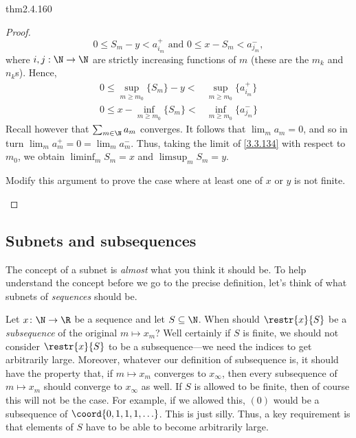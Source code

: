 \begin{thm}{}{thm2.4.160}
\begin{proof}
\begin{equation}
0\leq S_m-y<a_{i_m}^+\text{ and }0\leq x-S_m<a_{j_m}^-,
\end{equation}
where $i,j:\N \rightarrow \N$ are strictly increasing functions of $m$ (these are the $m_k$ and $n_k$s).  Hence,
\begin{subequations}\label{3.3.134}
\begin{align}
0\leq \sup _{m\geq m_0}\{ S_m\}-y< & \sup _{m\geq m_0}\{ a_{i_m}^+\} \\
0\leq x-\inf _{m\geq m_0}\{ S_m\} < & \inf _{m\geq m_0}\{ a_{j_m}^-\}
\end{align}
\end{subequations}
Recall however that $\sum _{m\in \N}a_m$ converges.  It follows that $\lim _ma_m=0$, and so in turn $\lim _ma_m^+=0=\lim _ma_m^-$.  Thus, taking the limit of \eqref{3.3.134} with respect to $m_0$, we obtain $\liminf _mS_m=x$ and $\limsup _mS_m=y$.

\begin{exr}[breakable=false]{}{}
Modify this argument to prove the case where at least one of $x$ or $y$ is not finite.
\end{exr}
\end{proof}
\end{thm}

\subsection{Subnets and subsequences}

The concept of a subnet is \emph{almost} what you think it should be.  To help understand the concept before we go to the precise definition, let's think of what subnets of \emph{sequences} should be.

Let $x\colon \N \rightarrow \R$ be a sequence and let $S\subseteq \N$.  When should $\restr{x}{S}$ be a \emph{subsequence} of the original $m\mapsto x_m$?  Well certainly if $S$ is finite, we should not consider $\restr{x}{S}$ to be a subsequence---we need the indices to get arbitrarily large.  Moreover, whatever our definition of subsequence is, it should have the property that, if $m\mapsto x_m$ converges to $x_\infty$, then every subsequence of $m\mapsto x_m$ should converge to $x_\infty$ as well.  If $S$ is allowed to be finite, then of course this will not be the case.  For example, if we allowed this, $(0)$ would be a subsequence of $\coord{0,1,1,1,\ldots}$.  This is just silly.  Thus, a key requirement is that elements of $S$ have to be able to become arbitrarily large.

